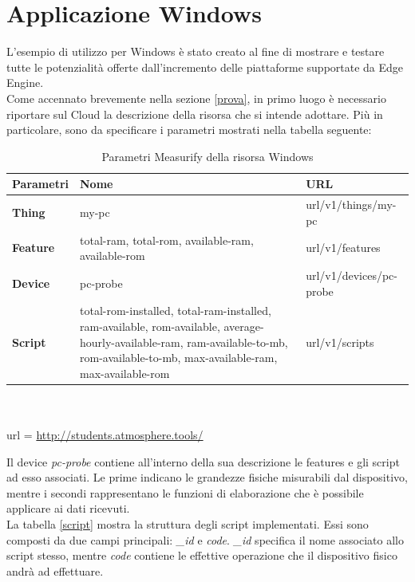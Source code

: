 \section{Applicazione Windows}
L'esempio di utilizzo per Windows è stato creato al fine di mostrare e testare tutte le potenzialità offerte dall'incremento delle piattaforme supportate da Edge Engine.\\
Come accennato brevemente nella sezione \ref{prova}, in primo luogo è necessario riportare sul Cloud la descrizione della risorsa che si intende adottare. Più in particolare, sono da specificare i parametri mostrati nella tabella seguente:
\begin{table}[H]
	\begin{tabular}{|p{}|p{}|p{}|}
		\hline
		\textbf{Parametri} & \textbf{Nome} & \textbf{URL}\\
		\hline
		\textbf{Thing} & my-pc & {{url}}/v1/things/my-pc\\
		\hline
		\textbf{Feature} & total-ram, total-rom, available-ram, available-rom & {{url}}/v1/features\\
		\hline
		\textbf{Device} & pc-probe & {{url}}/v1/devices/pc-probe\\	
		\hline
		\textbf{Script} & total-rom-installed, total-ram-installed, ram-available, rom-available, average-hourly-available-ram, ram-available-to-mb, rom-available-to-mb,  max-available-ram, max-available-rom & {{url}}/v1/scripts\\	
		\hline
	\end{tabular}
\\\\url = \url{http://students.atmosphere.tools/}
	\caption{Parametri Measurify della risorsa Windows}
	\label{paramMeas}
\end{table}
Il device \textit{pc-probe} contiene all'interno della sua descrizione le features e gli script ad esso associati. Le prime indicano le grandezze fisiche misurabili dal dispositivo, mentre i secondi rappresentano le funzioni di elaborazione che è possibile applicare ai dati ricevuti. \\
La tabella \ref{script} mostra la struttura degli script implementati. Essi sono composti da due campi principali: \textit{\_id} e \textit{code}.  \textit{\_id} specifica il nome associato allo script stesso, mentre  \textit{code} contiene le effettive operazione che il dispositivo fisico andrà ad effettuare. 

